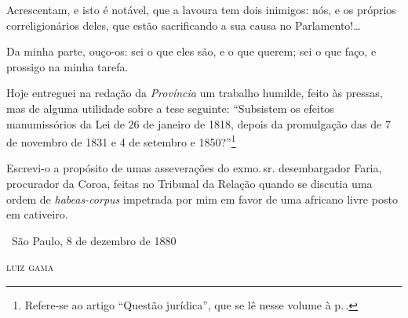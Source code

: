
Acrescentam, e isto é notável, que a lavoura tem dois inimigos: nós, e
os próprios correligionários deles, que estão sacrificando a sua causa
no Parlamento!\ldots{}

Da minha parte, ouço-os: sei o que eles são, e o que querem; sei o que
faço, e prossigo na minha tarefa.

Hoje entreguei na redação da \emph{Província} um trabalho humilde, feito
às pressas, mas de alguma utilidade sobre a tese seguinte: ``Subsistem os
efeitos manumissórios da Lei de 26 de janeiro de 1818, depois da
promulgação das de 7 de novembro de 1831 e 4 de setembro e
1850?''\footnote{Refere-se ao artigo ``Questão jurídica'', que se lê
  nesse volume à p.\,\pageref{questao}.}

Escrevi-o a propósito de
umas asseverações do exmo.\,sr. desembargador Faria, procurador da Coroa,
feitas no Tribunal da Relação quando se discutia uma ordem de
\emph{habeas-corpus} impetrada por mim em favor de uma africano livre
posto em cativeiro.

\medskip

\hfill\ São Paulo, 8 de dezembro de 1880

\hfill\textsc{luiz gama}


